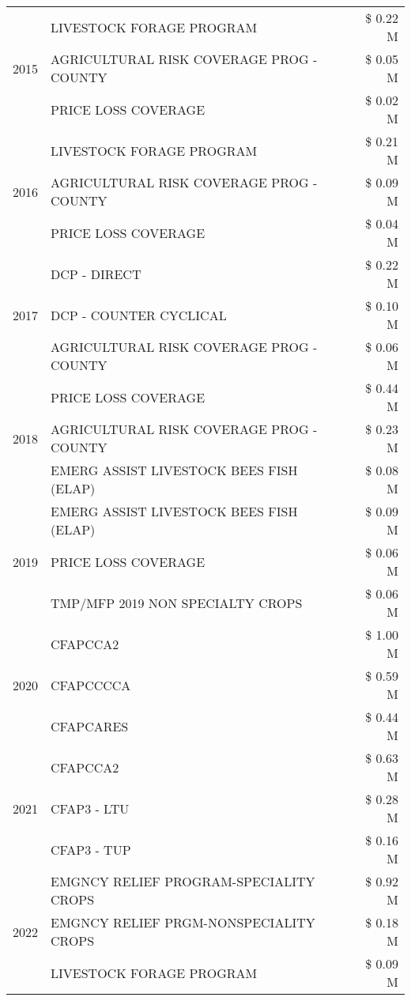 \begin{tabular}{llr}
\multirow[t]{3}{*}{2015} & LIVESTOCK FORAGE PROGRAM & \$ 0.22 M \\
 & AGRICULTURAL RISK COVERAGE PROG - COUNTY & \$ 0.05 M \\
 & PRICE LOSS COVERAGE & \$ 0.02 M \\
\cline{1-3}
\multirow[t]{3}{*}{2016} & LIVESTOCK FORAGE PROGRAM & \$ 0.21 M \\
 & AGRICULTURAL RISK COVERAGE PROG - COUNTY & \$ 0.09 M \\
 & PRICE LOSS COVERAGE & \$ 0.04 M \\
\cline{1-3}
\multirow[t]{3}{*}{2017} & DCP - DIRECT & \$ 0.22 M \\
 & DCP - COUNTER CYCLICAL & \$ 0.10 M \\
 & AGRICULTURAL RISK COVERAGE PROG - COUNTY & \$ 0.06 M \\
\cline{1-3}
\multirow[t]{3}{*}{2018} & PRICE LOSS COVERAGE & \$ 0.44 M \\
 & AGRICULTURAL RISK COVERAGE PROG - COUNTY & \$ 0.23 M \\
 & EMERG ASSIST LIVESTOCK BEES FISH (ELAP) & \$ 0.08 M \\
\cline{1-3}
\multirow[t]{3}{*}{2019} & EMERG ASSIST LIVESTOCK BEES FISH (ELAP) & \$ 0.09 M \\
 & PRICE LOSS COVERAGE & \$ 0.06 M \\
 & TMP/MFP 2019 NON SPECIALTY CROPS & \$ 0.06 M \\
\cline{1-3}
\multirow[t]{3}{*}{2020} & CFAPCCA2 & \$ 1.00 M \\
 & CFAPCCCCA & \$ 0.59 M \\
 & CFAPCARES & \$ 0.44 M \\
\cline{1-3}
\multirow[t]{3}{*}{2021} & CFAPCCA2 & \$ 0.63 M \\
 & CFAP3 - LTU & \$ 0.28 M \\
 & CFAP3 - TUP & \$ 0.16 M \\
\cline{1-3}
\multirow[t]{3}{*}{2022} & EMGNCY RELIEF PROGRAM-SPECIALITY CROPS & \$ 0.92 M \\
 & EMGNCY RELIEF PRGM-NONSPECIALITY CROPS & \$ 0.18 M \\
 & LIVESTOCK FORAGE PROGRAM & \$ 0.09 M \\
\cline{1-3}
\bottomrule
\end{tabular}

